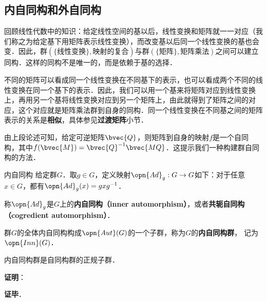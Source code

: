 \subsection{内自同构和外自同构}



回顾线性代数中的知识：给定线性空间的基以后，线性变换和矩阵就一一对应（我们称之为给定基下用矩阵表示线性变换），而改变基以后同一个线性变换的基也会变．因此，群$(\{\text{线性变换}\}, \text{映射的复合})$与群$(\{\text{矩阵}\}, \text{矩阵乘法})$之间可以建立同构．这样的同构不是唯一的，而是依赖于基的选择．

不同的矩阵可以看成同一个线性变换在不同基下的表示，也可以看成两个不同的线性变换在同一个基下的表示．因此，我们可以用一个基来将矩阵对应到线性变换上，再用另一个基将线性变换对应到另一个矩阵上，由此就得到了矩阵之间的对应，这个对应就是矩阵乘法群到自身的同构．同一个线性变换在不同基之间的矩阵表示的关系是\textbf{相似}，具体参见\textbf{过渡矩阵}小节．

由上段论述可知，给定可逆矩阵$\bvec{Q}$，则矩阵到自身的映射$f$是一个自同构，其中$f(\bvec{M})=\bvec{Q}^{-1}\bvec{MQ}$．这提示我们一种构建群自同构的方法．

\begin{definition}{内自同构}
给定群$G$．取$g\in G$，定义映射$\opn{Ad}_g:G\to G$如下：对于任意$x\in G$，都有$\opn{Ad}_g(x)=gxg^{-1}$．

称$\opn{Ad}_g$是$G$上的\textbf{内自同构（inner automorphism）}，或者\textbf{共轭自同构（cogredient automorphism）}．


群$G$的全体内自同构构成$\opn{Aut}(G)$的一个子群，称为$G$的\textbf{内自同构群}， 记为$\opn{Inn}(G)$．

\end{definition}

\begin{theorem}{}
内自同构群是自同构群的正规子群．
\end{theorem}

\textbf{证明}：



\textbf{证毕}．
















